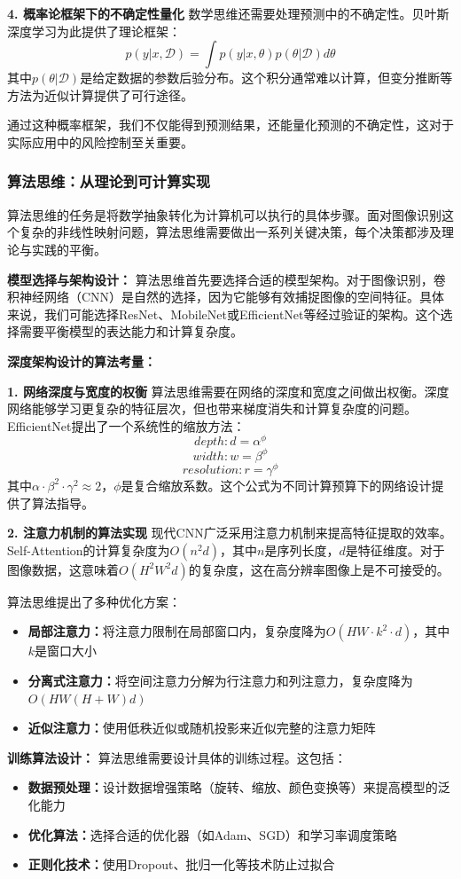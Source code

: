 \textbf{4. 概率论框架下的不确定性量化}
数学思维还需要处理预测中的不确定性。贝叶斯深度学习为此提供了理论框架：
$$p(y|x, \mathcal{D}) = \int p(y|x, \theta) p(\theta|\mathcal{D}) d\theta$$
其中$p(\theta|\mathcal{D})$是给定数据的参数后验分布。这个积分通常难以计算，但变分推断等方法为近似计算提供了可行途径。

通过这种概率框架，我们不仅能得到预测结果，还能量化预测的不确定性，这对于实际应用中的风险控制至关重要。

\subsubsection{算法思维：从理论到可计算实现}

算法思维的任务是将数学抽象转化为计算机可以执行的具体步骤。面对图像识别这个复杂的非线性映射问题，算法思维需要做出一系列关键决策，每个决策都涉及理论与实践的平衡。

\textbf{模型选择与架构设计：}
算法思维首先要选择合适的模型架构。对于图像识别，卷积神经网络（CNN）是自然的选择，因为它能够有效捕捉图像的空间特征。具体来说，我们可能选择ResNet、MobileNet或EfficientNet等经过验证的架构。这个选择需要平衡模型的表达能力和计算复杂度。

\textbf{深度架构设计的算法考量：}

\textbf{1. 网络深度与宽度的权衡}
算法思维需要在网络的深度和宽度之间做出权衡。深度网络能够学习更复杂的特征层次，但也带来梯度消失和计算复杂度的问题。EfficientNet提出了一个系统性的缩放方法：
$$depth: d = \alpha^\phi$$
$$width: w = \beta^\phi$$  
$$resolution: r = \gamma^\phi$$
其中$\alpha \cdot \beta^2 \cdot \gamma^2 \approx 2$，$\phi$是复合缩放系数。这个公式为不同计算预算下的网络设计提供了算法指导。

\textbf{2. 注意力机制的算法实现}
现代CNN广泛采用注意力机制来提高特征提取的效率。Self-Attention的计算复杂度为$O(n^2d)$，其中$n$是序列长度，$d$是特征维度。对于图像数据，这意味着$O(H^2W^2d)$的复杂度，这在高分辨率图像上是不可接受的。

算法思维提出了多种优化方案：
\begin{itemize}
\item \textbf{局部注意力：}将注意力限制在局部窗口内，复杂度降为$O(HW \cdot k^2 \cdot d)$，其中$k$是窗口大小
\item \textbf{分离式注意力：}将空间注意力分解为行注意力和列注意力，复杂度降为$O(HW(H+W)d)$
\item \textbf{近似注意力：}使用低秩近似或随机投影来近似完整的注意力矩阵
\end{itemize}

\textbf{训练算法设计：}
算法思维需要设计具体的训练过程。这包括：
\begin{itemize}
\item \textbf{数据预处理：}设计数据增强策略（旋转、缩放、颜色变换等）来提高模型的泛化能力
\item \textbf{优化算法：}选择合适的优化器（如Adam、SGD）和学习率调度策略
\item \textbf{正则化技术：}使用Dropout、批归一化等技术防止过拟合
\end{itemize}

